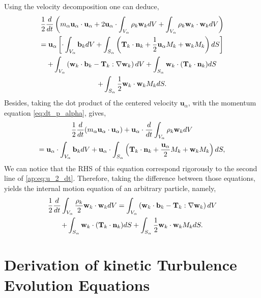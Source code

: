 Using the velocity decomposition one can deduce, 
\begin{multline}
    \frac{1}{2} \frac{d}{d t} \left(
        m_\alpha \textbf{u}_\alpha \cdot \textbf{u}_\alpha
        + 2\textbf{u}_\alpha \cdot \int_{V_\alpha}  \rho_k \textbf{w}_k dV
        + \int_{V_\alpha} \rho_k \textbf{w}_k \cdot \textbf{w}_k dV
    \right)\\
    =  \textbf{u}_\alpha \left[
        \cdot\int_{V_\alpha} \textbf{b}_k dV
        +  \int_{S_\alpha} \left(
            \textbf{T}_k \cdot \textbf{n}_k
            + \frac{1}{2} \textbf{u}_\alpha M_k 
            + \textbf{w}_k M_k 
        \right)dS
    \right]\\
    + \int_{V_\alpha} \left(
        \textbf{w}_k\cdot\textbf{b}_k
        -\textbf{T}_k : \mathbf{\nabla} \textbf{w}_k
    \right)dV
    + \int_{S_\alpha} 
        \textbf{w}_k\cdot(\textbf{T}_k\cdot \textbf{n}_k)
    dS\\
    + \int_{S_\alpha} \frac{1}{2} \textbf{w}_k \cdot \textbf{w}_k M_k dS.
    \label{ap:eq:u_2_dt}
\end{multline}
Besides, taking the dot product of the centered velocity $\textbf{u}_\alpha$, with the momentum equation \ref{eq:dt_p_alpha}, gives, 
\begin{multline*}
    \frac{1}{2}\frac{d}{d t} (m_\alpha \textbf{u}_\alpha \cdot \textbf{u}_\alpha)
    + \textbf{u}_\alpha \cdot \frac{d}{d t} \int_{V_\alpha} \rho_k \textbf{w}_k dV \\
    = \textbf{u}_\alpha \cdot \int_{V_\alpha} \textbf{b}_k dV
    + \textbf{u}_\alpha \cdot \int_{S_\alpha} \left(
    \textbf{T}_k \cdot\textbf{n}_k
    +\frac{\textbf{u}_\alpha}{2} M_k
    +\textbf{w}_k M_k
    \right)dS,
\end{multline*}
We can notice that the RHS of this equation correspond rigorously to the second line of \ref{ap:eq:u_2_dt}.
Therefore, taking the difference between those equations, yields the internal motion equation of an arbitrary particle, namely, 
\begin{multline*}
    \frac{1}{2}\frac{d}{d t} \int_{V_\alpha} \frac{\rho_k}{2} \textbf{w}_k \cdot \textbf{w}_k dV
    = \int_{V_\alpha} \left(
        \textbf{w}_k\cdot\textbf{b}_k
        -\textbf{T}_k : \mathbf{\nabla} \textbf{w}_k
    \right)dV\\
    + \int_{S_\alpha} 
        \textbf{w}_k\cdot(\textbf{T}_k\cdot \textbf{n}_k)
    dS
    + \int_{S_\alpha} \frac{1}{2} \textbf{w}_k \cdot \textbf{w}_k M_k dS.
\end{multline*}

\section{Derivation of kinetic Turbulence Evolution Equations}

